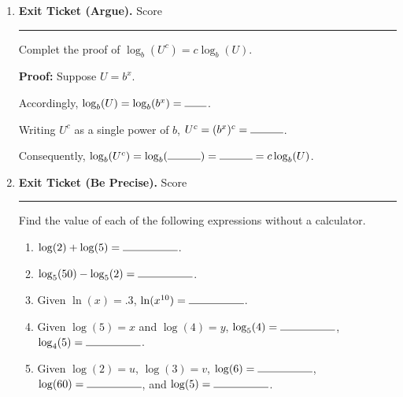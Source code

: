 \documentclass[twoside, 10pt]{article}
\begin{document}
\begin{enumerate}
\item {\bf Exit Ticket (Argue).} Score \rule{4em}{.4pt}

Complet the proof of $\log_b(U^c) = c\log_b(U)$.

\textbf{Proof:} 
Suppose $U = b^x$.
\vspace{1em}

Accordingly, $\log_b(U) = \log_b(b^x) = \rule{2em}{0.4pt}$.
\vspace{1em}

Writing $U^c$ as a single power of $b$, $U^c = (b^x)^c = \rule{3em}{0.4pt}$.
\vspace{1em}

Consequently, $\log_b(U^c) = \log_b(\rule{3em}{0.4pt}) = \rule{3em}{0.4pt} = c\log_b(U)$.

\vspace{1em}

\item {\bf Exit Ticket (Be Precise). } Score \rule{4em}{.4pt}

Find the value of each of the following expressions without a calculator.
\begin{enumerate}[itemsep=2em]
\item
$\log(2) + \log(5) = \rule{5em}{.4pt}$.

\item
$\log_5(50) - \log_5(2) = \rule{5em}{.4pt}$.

\item Given $\ln(x) = .3$, $\ln(x^{10}) =  \rule{5em}{.4pt}$.
\item Given $\log(5) = x$ and $\log(4) = y $, $\log_5(4) = \rule{5em}{.4pt}$, $\log_4(5) =\rule{5em}{.4pt}$.
\item Given $\log(2) = u$, $\log(3) = v$, $\log(6) =  \rule{5em}{.4pt}$, $\log(60) =  \rule{5em}{.4pt}$, and $\log(5) =  \rule{5em}{.4pt}$.
\end{enumerate}
\clearpage

\end{enumerate}
\end{document}
